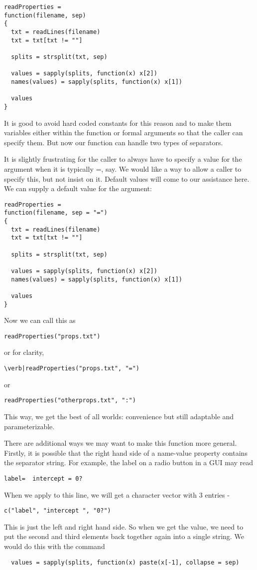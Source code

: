 {\begin{verbatim}
readProperties =
function(filename, sep) 
{
  txt = readLines(filename)
  txt = txt[txt != ""]

  splits = strsplit(txt, sep)

  values = sapply(splits, function(x) x[2])
  names(values) = sapply(splits, function(x) x[1])

  values
}
\end{verbatim}

It is good to avoid hard coded constants for this reason and to make
them variables either within the function or formal arguments so that
the caller can specify them. But now our function can handle two types
of separators.

It is slightly frustrating for the caller to always have to specify a
value for the  argument when it is typically =, say. We
would like a way to allow a caller to specify this, but not insist on
it. Default values will come to our assistance here. We can supply a
default value for the  argument:
\begin{verbatim}
readProperties =
function(filename, sep = "=") 
{
  txt = readLines(filename)
  txt = txt[txt != ""]

  splits = strsplit(txt, sep)

  values = sapply(splits, function(x) x[2])
  names(values) = sapply(splits, function(x) x[1])

  values
}
\end{verbatim}
Now we can call this as 
\begin{verbatim}
readProperties("props.txt")
\end{verbatim}
or for clarity,
\begin{verbatim}
\verb|readProperties("props.txt", "=")
\end{verbatim}
or
\begin{verbatim}
readProperties("otherprops.txt", ":")
\end{verbatim}
This way, we get the best of all worlds: convenience but still
adaptable and parameterizable.

There are additional ways we may want to make this function more
general. Firstly, it is possible that the right hand side of a
name-value property contains the separator string. For example, the
label on a radio button in a GUI may read
\begin{verbatim}
label=  intercept = 0?
\end{verbatim}
When we apply  to this line, we will get a
character vector with 3 entries - 
\begin{verbatim}
c("label", "intercept ", "0?")
\end{verbatim}
This is just the left and right hand side. So when we get the value,
we need to put the second and third elements back together again into
a single string. We would do this with the command
\begin{verbatim}
  values = sapply(splits, function(x) paste(x[-1], collapse = sep)
\end{verbatim}


}
